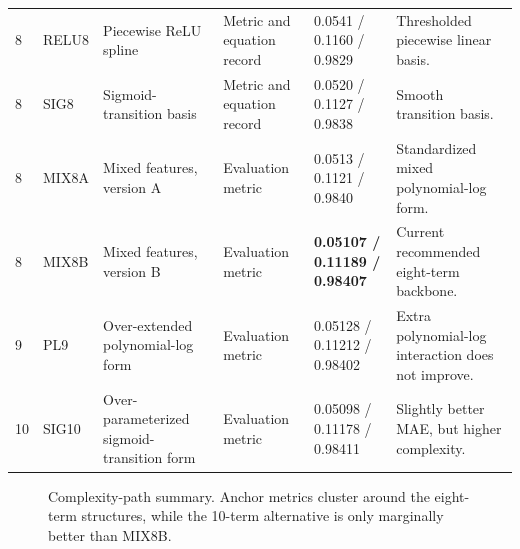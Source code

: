 \documentclass[10pt]{article}
\newcommand{\metric}[3]{#1 / #2 / #3}
\begin{document}
\begin{longtable}{C{0.7cm}C{1.5cm}L{3.8cm}L{2.45cm}L{3.0cm}L{3.3cm}}
8 & RELU8 & Piecewise ReLU spline & Metric and equation record & \metric{0.0541}{0.1160}{0.9829} & Thresholded piecewise linear basis. \\
8 & SIG8 & Sigmoid-transition basis & Metric and equation record & \metric{0.0520}{0.1127}{0.9838} & Smooth transition basis. \\
8 & MIX8A & Mixed features, version A & Evaluation metric & \metric{0.0513}{0.1121}{0.9840} & Standardized mixed polynomial-log form. \\
8 & MIX8B & Mixed features, version B & Evaluation metric & \textbf{\metric{0.05107}{0.11189}{0.98407}} & Current recommended eight-term backbone. \\
9 & PL9 & Over-extended polynomial-log form & Evaluation metric & \metric{0.05128}{0.11212}{0.98402} & Extra polynomial-log interaction does not improve. \\
10 & SIG10 & Over-parameterized sigmoid-transition form & Evaluation metric & \metric{0.05098}{0.11178}{0.98411} & Slightly better MAE, but higher complexity. \\
\bottomrule
\end{longtable}
\endgroup

\begin{figure}[htbp]
\centering
{}
\caption{Complexity-path summary. Anchor metrics cluster around the eight-term structures, while the 10-term alternative is only marginally better than MIX8B.}
\end{figure}
\end{document}
